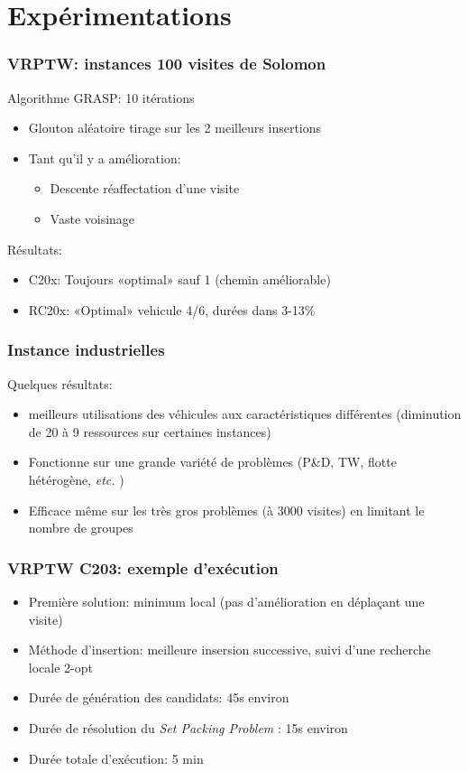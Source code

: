 \documentclass[table]{beamer}
\newcommand*{\foreign}[2][english]{%
    \emph{\foreignlanguage{#1}{#2}}%
}
\begin{document}
\section{Expérimentations}

\begin{frame}
  \frametitle{VRPTW: instances 100 visites de Solomon}

  Algorithme GRASP: 10 itérations
  \begin{itemize}
  \item Glouton aléatoire tirage sur les 2 meilleurs insertions
  \item Tant qu'il y a amélioration:
    \begin{itemize}
    \item Descente réaffectation d'une visite
    \item Vaste voisinage
    \end{itemize}
  \end{itemize}

  Résultats:
  \begin{itemize}
  \item C20x: Toujours «optimal» sauf 1 (chemin améliorable)
  \item RC20x: «Optimal» vehicule 4/6, durées dans 3-13\%
  \end{itemize}
\end{frame}

\begin{frame}
  \frametitle{Instance industrielles}

  Quelques résultats:
  \begin{itemize}
  \item meilleurs utilisations des véhicules aux caractéristiques
    différentes (diminution de 20 à 9 ressources sur certaines
    instances)
  \item Fonctionne sur une grande variété de problèmes (P\&D, TW,
    flotte hétérogène, \foreign{etc.})
  \item Efficace même sur les très gros problèmes (à 3000 visites) en
    limitant le nombre de groupes
  \end{itemize}
\end{frame}

\begin{frame}
  \frametitle{VRPTW C203: exemple d'exécution}

  \begin{itemize}
  \item Première solution: minimum local (pas d'amélioration en
    déplaçant une visite)
  \item Méthode d'insertion: meilleure insersion successive, suivi
    d'une recherche locale 2-opt
  \item Durée de génération des candidats: 45s environ
  \item Durée de résolution du \foreign{Set Packing Problem}: 15s environ
  \item Durée totale d'exécution: 5 min
  \end{itemize}
\end{frame}
\end{document}
